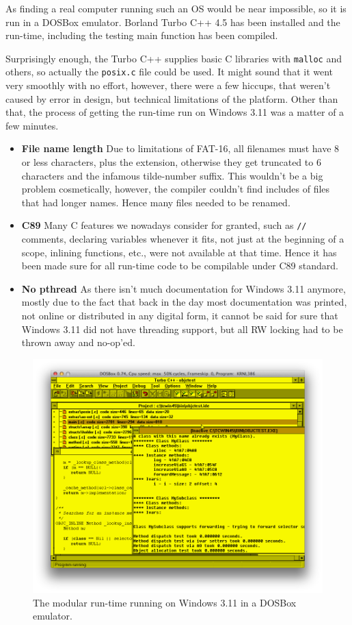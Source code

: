 As finding a real computer running such an OS would be near impossible, so it is run in a DOSBox emulator. Borland Turbo C++ 4.5 has been installed and the run-time, including the testing main function has been compiled.

Surprisingly enough, the Turbo C++ supplies basic C libraries with \verb=malloc= and others, so actually the \verb=posix.c= file could be used. It might sound that it went very smoothly with no effort, however, there were a few hiccups, that weren't caused by error in design, but technical limitations of the platform. Other than that, the process of getting the run-time run on Windows 3.11 was a matter of a few minutes.

\begin{itemize}
  \item{\bf{File name length}} Due to limitations of FAT-16, all filenames must have 8 or less characters, plus the extension, otherwise they get truncated to 6 characters and the infamous tilde-number suffix. This wouldn't be a big problem cosmetically, however, the compiler couldn't find includes of files that had longer names. Hence many files needed to be renamed.
  \item{\bf{C89}} Many C features we nowadays consider for granted, such as \verb=//= comments, declaring variables whenever it fits, not just at the beginning of a scope, inlining functions, etc., were not available at that time. Hence it has been made sure for all run-time code to be compilable under C89 standard.
  \item{\bf{No pthread}} As there isn't much documentation for Windows 3.11 anymore, mostly due to the fact that back in the day most documentation was printed, not online or distributed in any digital form, it cannot be said for sure that Windows 3.11 did not have threading support, but all RW locking had to be thrown away and no-op'ed. 
\end{itemize}

\begin{figure}[H]
  \includegraphics[width=\textwidth]{img/dos_box_3_11.png}
  
  \centering{}
  \caption{The modular run-time running on Windows 3.11 in a DOSBox emulator.}
  \label{fig:win_3_11}
\end{figure}

